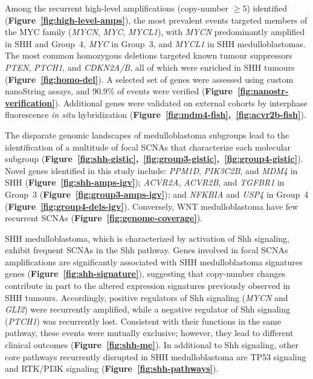 \documentclass[11pt,letterpaper]{article}
\theoremstyle{definition}
\begin{document}
Among the recurrent high-level amplifications (copy-number $\geq 5$) identified (\textbf{Figure~\ref{fig:high-level-amps}}), the most prevalent events targeted members of the MYC family (\emph{MYCN}, \emph{MYC}, \emph{MYCL1}), with \emph{MYCN} predominantly amplified in SHH and Group~4, \emph{MYC} in Group~3, and \emph{MYCL1} in SHH medulloblastomas.
The most common homozygous deletions targeted known tumour suppressors \emph{PTEN}, \emph{PTCH1}, and \emph{CDKN2A/B}, all of which were enriched in SHH tumours (\textbf{Figure~\ref{fig:homo-del}}). A selected set of genes were assessed using custom nanoString assays, and 90.9\% of events were verified (\textbf{Figure~\ref{fig:nanostr-verification}}). Additional genes were validated on external cohorts by interphase fluorescence \emph{in situ} hybridization (\textbf{Figure~\ref{fig:mdm4-fish},~\ref{fig:acvr2b-fish}}).

The disparate genomic landscapes of medulloblastoma subgroups lead to the identification of a multitude of focal SCNAs that characterize each molecular subgroup (\textbf{Figure~\ref{fig:shh-gistic},~\ref{fig:group3-gistic},~\ref{fig:group4-gistic}}). Novel genes identified in this study include: \emph{PPM1D}, \emph{PIK3C2B}, and \emph{MDM4} in SHH (\textbf{Figure~\ref{fig:shh-amps-igv}}); \emph{ACVR2A}, \emph{ACVR2B}, and \emph{TGFBR1} in Group~3 (\textbf{Figure~\ref{fig:group3-amps-igv}}); and \emph{NFKBIA} and \emph{USP4} in Group~4 (\textbf{Figure~\ref{fig:group4-dels-igv}}). Conversely, WNT medulloblastoma have few recurrent SCNAs (\textbf{Figure~\ref{fig:genome-coverage}}). 

SHH medulloblastoma, which is characterized by activation of Shh signaling, exhibit frequent SCNAs in the Shh pathway. Genes involved in focal SCNAs amplifications are significantly associated with SHH medulloblastoma signatures genes (\textbf{Figure~\ref{fig:shh-signature}}), suggesting that copy-number changes contribute in part to the altered expression signatures previously observed in SHH tumours. Accordingly, positive regulators of Shh signaling (\emph{MYCN} and \emph{GLI2}) were recurrently amplified, while a negative regulator of Shh signaling (\emph{PTCH1}) was recurrently lost. Consistent with their functions in the same pathway, these events were mutually exclusive; however, they lead to different clinical outcomes (\textbf{Figure~\ref{fig:shh-me}}). In additional to Shh signaling, other core pathways recurrently disrupted in SHH medulloblastoma are TP53 signaling and RTK/PI3K signaling (\textbf{Figure~\ref{fig:shh-pathways}}).
\end{document}
